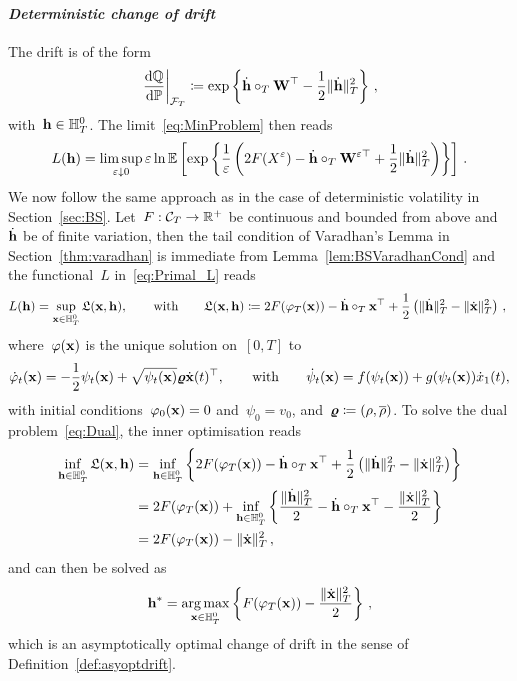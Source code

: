 \paragraph{\textit{Deterministic change of drift}}
The drift is of the form
$$ 
\left.\frac{\D\QQ}{\D\PP}\right|_{\Ff_T} \defEqual \exp\left\{\dot{\hh}\cT \Wf^\top - \frac{1}{2}\|\dot{\hh}\|_{T}^2\right\}\,,
$$
with~$\hh\in \HH_T^0$.
The limit~\eqref{eq:MinProblem} %
then reads
$$
L(\hh) = \limsup_{\eps\downarrow 0}
\eps\ln\EE\left[
\exp\left\{\frac{1}{\eps}\left(2F(X^{\eps}) - \dot{\hh}\cT \Wf^{\eps\top} + \frac{1}{2}\|\dot{\hh}\|_{T}^2\right)\right\}
\right]\,.
$$
We now follow the same approach as in the case of deterministic volatility in Section~\ref{sec:BS}. 
Let~$F:\Cc_T\rightarrow\RR^+$ be continuous and bounded from above and~$\dot{\hh}$ be of finite variation, then the tail condition of Varadhan's Lemma in Section~\ref{thm:varadhan} is immediate from Lemma~\ref{lem:BSVaradhanCond} and 
the functional~$L$ in~\eqref{eq:Primal_L} reads
$$
L(\hh) = \sup\limits_{\xx\in \HH_T^0}
\Lf(\xx,\hh),
\qquad\text{with}\qquad
\Lf(\xx,\hh) \defEqual 2 F(\varphi_T(\xx)) - \dot{\hh}\cT \xx^\top
 + \half\left(\|\dot{\hh}\|_{T}^2 - \|\dot{\xx}\|_{T}^2\right)\,,
~$$
where~$\varphi(\xx)$ is the unique solution on~$[0,T]$ to
$$
\dot{\varphi}_t(\xx) = -\frac{1}{2}\psi_t(\xx) + \sqrt{\psi_t(\xx)}\vrho\dot{\xx}(t)^\top,
\qquad\text{with}\qquad
\dot{\psi}_t(\xx) = f(\psi_t(\xx)) + g(\psi_t(\xx)) \dot{x}_1(t), %
$$
with initial conditions~$\varphi_0(\xx) = 0$ and~$\psi_0 = v_0$, and~$\vrho\defEqual(\rho, \brho)$. 
To solve the dual problem~\eqref{eq:Dual}, the inner optimisation reads
\begin{align*}
\inf_{\hh\in\HH_T^0}\Lf(\xx,\hh) &= \inf_{\hh\in\HH_T^0} \left\{2F(\varphi_T(\xx)) - \dot{\hh}\cT \xx^\top
 + \half\left(\|\dot{\hh}\|_{T}^2 - \|\dot{\xx}\|_{T}^2\right)\right\} \\
&= 2F(\varphi_T(\xx)) + \inf_{\hh\in\HH_T^0}\left\{\frac{\|\dot{\hh}\|_{T}^2}{2} -\dot{\hh}\cT \xx^\top - \frac{\|\dot{\xx}\|_{T}^2}{2}\right\} \\
&= 2F(\varphi_T(\xx)) - \|\dot{\xx}\|_{T}^2\,,
\end{align*}
and can then be solved as 
\begin{equation}\label{eq:detoptdrift_dual}
\hh^* = \argmax\limits_{\xx\in \HH_T^0} 
\left\{F(\varphi_T(\xx)) - \frac{\|\dot{\xx}\|_{T}^2}{2}\right\}\,,
\end{equation}
which is an asymptotically optimal change of drift in the sense of Definition~\ref{def:asyoptdrift}.\\

